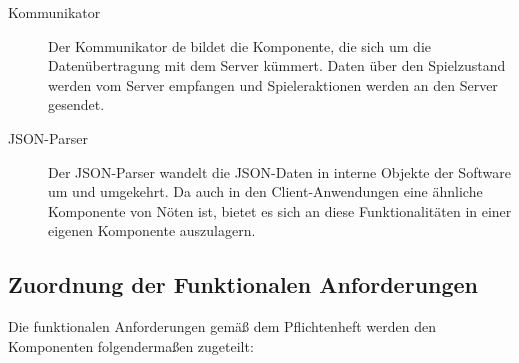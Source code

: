 \begin{description}
			\item[Kommunikator]
			Der Kommunikator de bildet die Komponente, die sich um die Datenübertragung mit dem Server kümmert. Daten über den Spielzustand werden vom Server empfangen und Spieleraktionen werden an den Server gesendet.
			
			\item[JSON-Parser]
			Der JSON-Parser wandelt die JSON-Daten in interne Objekte der Software um und umgekehrt. Da auch in den Client-Anwendungen eine ähnliche Komponente von Nöten ist, bietet es sich an diese Funktionalitäten in einer eigenen Komponente auszulagern.  

		\end{description}
		
	\subsection{Zuordnung der Funktionalen Anforderungen}
	
	Die funktionalen Anforderungen gemäß dem Pflichtenheft werden den Komponenten folgendermaßen zugeteilt:
	
